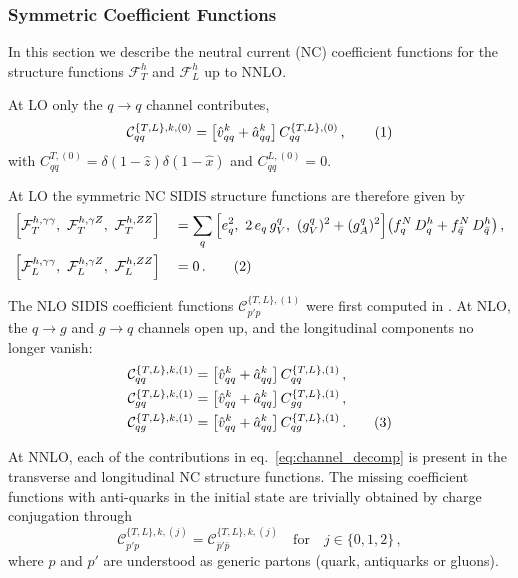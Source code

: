 \documentclass[11pt,a4paper]{article}
\newcommand{\Fcal}{\mathcal{F}}
\newcommand{\Ccal}{\mathcal{C}}
\newcommand{\qb}{\bar{q}}
\newcommand{\NC}{\mathrm{NC}}
\newcommand{\vh}{\hat{v}}
\newcommand{\ah}{\hat{a}}
\newcommand{\xh}{\hat{x}}
\newcommand{\zh}{\hat{z}}
\newcommand\numberthis{\addtocounter{equation}{1}\tag{\theequation}}
\begin{document}
\subsubsection{Symmetric Coefficient Functions}\label{sec:NCSymmCF}
In this section we describe the neutral current (NC) coefficient functions for the structure functions $\mathcal{F}^h_T$ and $\mathcal{F}^h_L$ up to NNLO.

At LO only the $q\to q$ channel contributes,
\begin{align*}
\Ccal^{\{T,L\},k,(0)}_{qq} = \left[ \vh_{qq}^k + \ah_{qq}^k \right] C^{\{T,L\},(0)}_{qq} \,  , \numberthis
\end{align*}
with $C^{T,(0)}_{qq} = \delta(1-\zh)\delta(1-\xh)$ and $C^{L,(0)}_{qq} = 0$.

At LO the symmetric $\NC$ SIDIS structure functions are therefore given by
\begin{alignat*}{2}
& \Big[ \Fcal_{T}^{h,\gamma\gamma},~ \Fcal_{T}^{h,\gamma Z},~ \Fcal_{T}^{h,ZZ} \Big] &&= \sum_{q} \Big[ e_q^2,~ 2 \, e_q \, g_V^q ,~ (g_V^q)^2 + (g_A^q)^2 \Big] \big( f_q^N \, D_q^h + f_{\qb}^N \, D_{\qb}^h \big) \, , \\
%
& \Big[ \Fcal_{L}^{h,\gamma\gamma},~ \Fcal_{L}^{h,\gamma Z},~ \Fcal_{L}^{h,ZZ} \Big] &&= 0 \, . \numberthis
\end{alignat*}


The NLO SIDIS coefficient functions $\Ccal^{\{T,L\},(1)}_{p'p}$ were first computed in \cite{Altarelli:1979kv,Baier:1979sp}.
At NLO, the $q\to g$ and $g\to q$ channels open up, and the longitudinal components no longer vanish:
\begin{align*}
\Ccal^{\{T,L\},k,(1)}_{qq} &= \left[ \vh_{qq}^k + \ah_{qq}^k \right] C^{\{T,L\},(1)}_{qq} \,  , \\
\Ccal^{\{T,L\},k,(1)}_{gq} &= \left[ \vh_{qq}^k + \ah_{qq}^k \right] C^{\{T,L\},(1)}_{gq} \,  , \\
\Ccal^{\{T,L\},k,(1)}_{qg} &= \left[ \vh_{qq}^k + \ah_{qq}^k \right] C^{\{T,L\},(1)}_{qg} \,  . \numberthis
\end{align*}

At NNLO, each of the contributions in eq.~\eqref{eq:channel_decomp} is present in the transverse and longitudinal $\NC$ structure functions.
The missing coefficient functions with anti-quarks in the initial state are trivially obtained by charge conjugation through
\begin{equation}
\Ccal^{\{T,L\},k,(j)}_{p'p} = \Ccal^{\{T,L\},k,(j)}_{\bar{p}'\bar{p}}\quad \mathrm{for} \quad j \in \{0,1,2\} \, ,
\end{equation}
where $p$ and $p'$ are understood as generic partons (quark, antiquarks or gluons).
\end{document}
